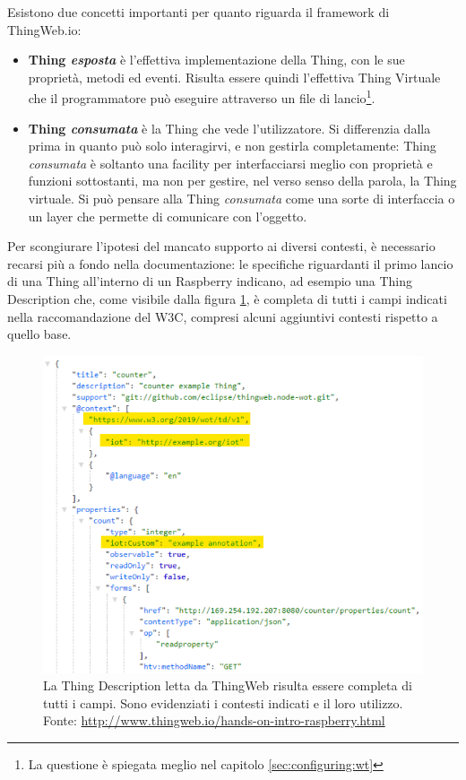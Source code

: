 \documentclass[12pt,a4paper,openright,oneside]{report}
\begin{document}
Esistono due concetti importanti per quanto riguarda il framework di ThingWeb.io:
\begin{itemize}
	\item \textbf{Thing \textit{esposta}} è l'effettiva implementazione della Thing, con le sue proprietà, metodi ed eventi. Risulta essere quindi l'effettiva Thing Virtuale che il programmatore può eseguire attraverso un file di lancio\footnote{La questione è spiegata meglio nel capitolo \ref{sec:configuring:wt}}.
	
	\item \textbf{Thing \textit{consumata}} è la Thing che vede l'utilizzatore. Si differenzia dalla prima in quanto può solo interagirvi, e non gestirla completamente: Thing \textit{consumata} è soltanto una facility per interfacciarsi meglio con proprietà e funzioni sottostanti, ma non per gestire, nel verso senso della parola, la Thing virtuale. Si può pensare alla Thing \textit{consumata} come una sorte di interfaccia o un layer che permette di comunicare con l'oggetto.
\end{itemize}

Per scongiurare l'ipotesi del mancato supporto ai diversi contesti, è necessario recarsi più a fondo nella documentazione: le specifiche riguardanti il primo lancio di una Thing all'interno di un Raspberry indicano, ad esempio una Thing Description che, come visibile dalla figura \ref{fig:context-ok-thingweb}, è completa di tutti i campi indicati nella raccomandazione del W3C, compresi alcuni aggiuntivi contesti rispetto a quello base.\\

\begin{figure}[h]
	\centering
	\includegraphics[scale=0.8]{eps/context_ok_thingweb.png}
	\caption{La Thing Description letta da ThingWeb risulta essere completa di tutti i campi. Sono evidenziati i contesti indicati e il loro utilizzo. Fonte: \url{http://www.thingweb.io/hands-on-intro-raspberry.html}}
	\label{fig:context-ok-thingweb}
\end{figure}
\end{document}
